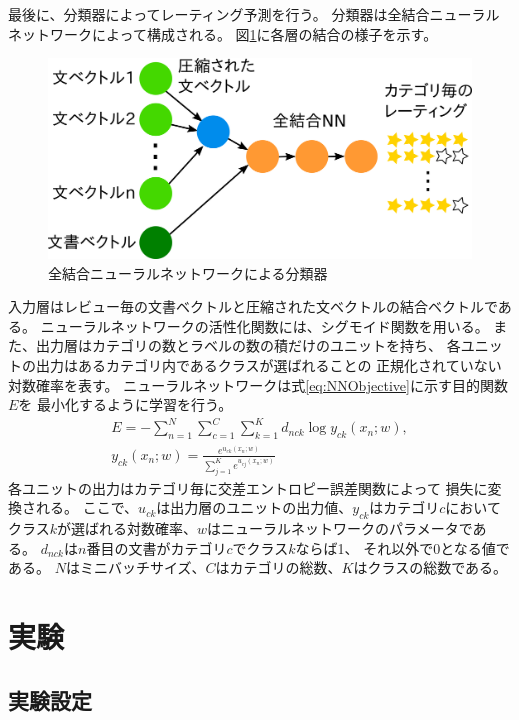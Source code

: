 \documentclass[twocolumn,a4paper]{ltjarticle}
\makeatletter
\let\tti@includegraphics\includegraphics
\renewcommand{\includegraphics}[1]{%
    \tti@includegraphics[width=\linewidth]{#1}}
\makeatother
\begin{document}
最後に、分類器によってレーティング予測を行う。
分類器は全結合ニューラルネットワークによって構成される。
図\ref{fig:MyModel}に各層の結合の様子を示す。
\begin{figure}[t!]
  \includegraphics{fig/model.png}
  \caption{全結合ニューラルネットワークによる分類器}
  \label{fig:MyModel}
\end{figure}
入力層はレビュー毎の文書ベクトルと圧縮された文ベクトルの結合ベクトルである。
ニューラルネットワークの活性化関数には、シグモイド関数を用いる。
また、出力層はカテゴリの数とラベルの数の積だけのユニットを持ち、
各ユニットの出力はあるカテゴリ内であるクラスが選ばれることの
正規化されていない対数確率を表す。
ニューラルネットワークは式\ref{eq:NNObjective}に示す目的関数$E$を
最小化するように学習を行う。
\begin{gather}
  E = - \sum^{N}_{n = 1} \sum^{C}_{c = 1} \sum^{K}_{k = 1}
        d_{nck} \log{y_{ck}(x_n; w)},
  \label{eq:NNObjective} \\
  y_{ck}(x_n; w) = \frac{e^{u_{ck}(x_n; w)}}
                        {\sum^{K}_{j = 1} e^{u_{cj}(x_n; w)}} \nonumber
\end{gather}
各ユニットの出力はカテゴリ毎に交差エントロピー誤差関数によって
損失に変換される。
ここで、$u_{ck}$は出力層のユニットの出力値、$y_{ck}$はカテゴリ$c$において
クラス$k$が選ばれる対数確率、$w$はニューラルネットワークのパラメータである。
$d_{nck}$は$n$番目の文書がカテゴリ$c$でクラス$k$ならば1、
それ以外で0となる値である。
$N$はミニバッチサイズ、$C$はカテゴリの総数、$K$はクラスの総数である。


\section{実験}

\subsection{実験設定}
\end{document}

